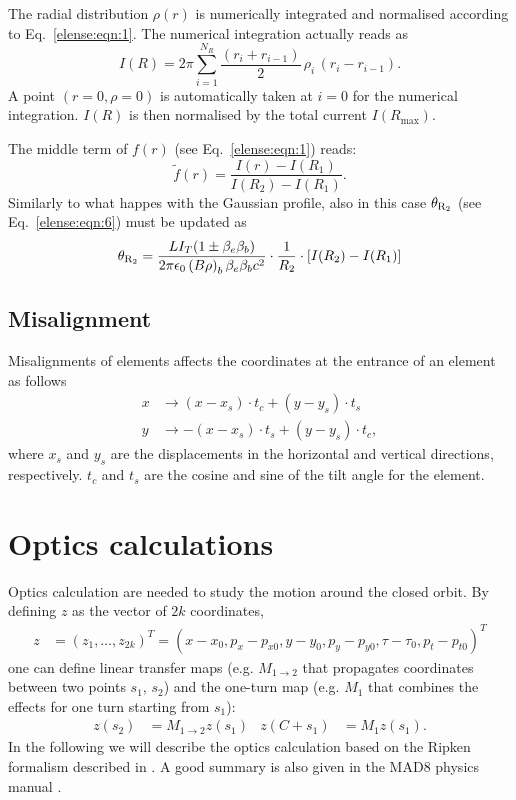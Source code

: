 \documentclass[english]{article}
\begin{document}
The radial distribution $\rho(r)$ is numerically integrated and normalised
according to Eq.~\ref{elense:eqn:1}. The numerical integration actually reads as
\begin{equation}
  I(R) = 2\pi \sum_{i=1}^{N_R} \frac{(r_i+r_{i-1})}{2} \, \rho_i \, (r_i-r_{i-1}).
\label{elense:eqn:5}
\end{equation}
A point $(r=0,\rho=0)$ is automatically taken at $i=0$ for the numerical
integration. $I(R)$ is then normalised by the total current $I(R_{\textrm{max}})$.

The middle term of $f(r)$ (see Eq.~\ref{elense:eqn:1}) reads:
\begin{equation}
\tilde f(r)=\frac{I(r)-I(R_1)}{I(R_2)-I(R_1)}.
\end{equation}
Similarly to what happes with the Gaussian profile, also in this case
$\theta_{\rm R_2}$ (see Eq.~\ref{elense:eqn:6}) must be updated as
\begin{equation}
  \theta_{\rm R_2} = \frac{LI_T(1\pm\beta_e\beta_b)}{2\pi\epsilon_0  \left(B\rho\right)_b\beta_e\beta_b c^2}\cdot\frac{1}{R_2}
  \cdot\left[ I(R_2)-I(R_1) \right]
\end{equation}

\subsection{Misalignment}

Misalignments of elements affects the coordinates at the entrance of an
element as follows
\begin{align}
    x &\to (x-x_s)\cdot t_c + (y-y_s)\cdot t_s \\
    y &\to -(x-x_s)\cdot t_s + (y-y_s)\cdot t_c,
\end{align}
where $x_s$ and $y_s$ are the displacements in the horizontal and vertical
directions, respectively. $t_c$ and $t_s$ are the cosine and sine of the tilt
angle for the element.

\section{Optics calculations}
\label{opt}
Optics calculation are needed to study the motion around the closed orbit. By defining $z$ as the vector of $2 k$ coordinates,  
\begin{align}\label{opt:eqn:1}
z&=(z_1,\ldots,z_{2k})^T=(x-x_0,p_x-p_{x0},y-y_0,p_y-p_{y0},\tau-\tau_0,p_t-p_{t0})^T
\end{align}
one can define linear transfer maps (e.g. $M_{1\to 2}$ that propagates coordinates between two points $s_1$, $s_2$) and the one-turn map (e.g. $M_1$ that combines the effects for one turn starting from $s_1$):
\begin{align}\label{opt:eqn:2}
z(s_2)&= M_{1\to 2} z(s_1) & z(C+s_1) &= M_1 z(s_1).
\end{align}
In the following we will describe the optics calculation based on the Ripken formalism described in \cite{willeke88}. A good summary is also given in the MAD8 physics manual \cite{mad8phys}.
\end{document}
